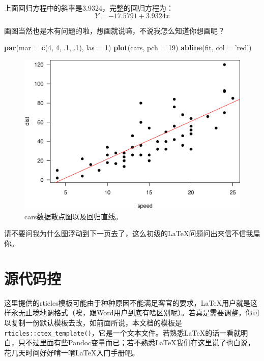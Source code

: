 \documentclass[hyperref,]{ctexart}
\newenvironment{Shaded}{\begin{snugshade}}{\end{snugshade}}
\newcommand{\DataTypeTok}[1]{\textcolor[rgb]{0.13,0.29,0.53}{#1}}
\newcommand{\DecValTok}[1]{\textcolor[rgb]{0.00,0.00,0.81}{#1}}
\newcommand{\FloatTok}[1]{\textcolor[rgb]{0.00,0.00,0.81}{#1}}
\newcommand{\KeywordTok}[1]{\textcolor[rgb]{0.13,0.29,0.53}{\textbf{#1}}}
\newcommand{\NormalTok}[1]{#1}
\newcommand{\StringTok}[1]{\textcolor[rgb]{0.31,0.60,0.02}{#1}}
\begin{document}
上面回归方程中的斜率是3.9324，完整的回归方程为：\[ Y = -17.5791 + 3.9324x\]

画图当然也是木有问题的啦，想画就说嘛，不说我怎么知道你想画呢？

\begin{Shaded}
\begin{Highlighting}[]
\KeywordTok{par}\NormalTok{(}\DataTypeTok{mar =} \KeywordTok{c}\NormalTok{(}\DecValTok{4}\NormalTok{, }\DecValTok{4}\NormalTok{, }\FloatTok{.1}\NormalTok{, }\FloatTok{.1}\NormalTok{), }\DataTypeTok{las =} \DecValTok{1}\NormalTok{)}
\KeywordTok{plot}\NormalTok{(cars, }\DataTypeTok{pch =} \DecValTok{19}\NormalTok{)}
\KeywordTok{abline}\NormalTok{(fit, }\DataTypeTok{col =} \StringTok{'red'}\NormalTok{)}
\end{Highlighting}
\end{Shaded}

\begin{figure}
\centering
\includegraphics{在R-Markdown文档中使用中文_files/figure-latex/scatter-1.pdf}
\caption{cars数据散点图以及回归直线。}
\end{figure}

请不要问我为什么图浮动到下一页去了，这么初级的LaTeX问题问出来信不信我扁你。

\hypertarget{ux6e90ux4ee3ux7801ux63a7}{%
\section{源代码控}\label{ux6e90ux4ee3ux7801ux63a7}}

这里提供的rticles模板可能由于种种原因不能满足客官的要求，LaTeX用户就是这样永无止境地调格式（唉，跟Word用户到底有啥区别呢）。若真是需要调整，你可以复制一份默认模板去改，如前面所说，本文档的模板是\texttt{rticles::ctex\_template()}，它是一个文本文件。若熟悉LaTeX的话一看就明白，只不过里面有些Pandoc变量而已；若不熟悉LaTeX我们在这里说了也白说，花几天时间好好啃一啃LaTeX入门手册吧。
\end{document}
